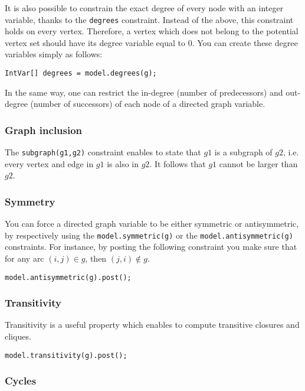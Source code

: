 \documentclass{article}
\begin{document}
It is also possible to constrain the exact degree of every node with an integer variable, thanks to the \texttt{degrees} constraint. Instead of the above, this constraint holds on every vertex. Therefore, a vertex which does not belong to the potential vertex set should have its degree variable equal to $0$. You can create these degree variables simply as follows:
\begin{lstlisting}
IntVar[] degrees = model.degrees(g);
\end{lstlisting}

In the same way, one can restrict the in-degree (number of predecessors) and out-degree (number of successors) of each node of a directed graph variable.  
 
\subsubsection{Graph inclusion}

The \texttt{subgraph(g1,g2)} constraint enables to state that $g1$ is a subgraph of $g2$, i.e. every vertex and edge in $g1$ is also in $g2$. It follows that $g1$ cannot be larger than $g2$. 

\subsubsection{Symmetry}

You can force a directed graph variable to be either symmetric or antisymmetric, by respectively using the \texttt{model.symmetric(g)} or the \texttt{model.antisymmetric(g)} constraints. For instance, by posting the following constraint you make sure that for any arc $(i,j)\in g$, then $(j,i) \notin g$.
\begin{lstlisting}
model.antisymmetric(g).post();
\end{lstlisting}  

\subsubsection{Transitivity}

Transitivity is a useful property which enables to compute transitive closures and cliques. 
\begin{lstlisting}
model.transitivity(g).post();
\end{lstlisting}  

\subsubsection{Cycles}
\end{document}

